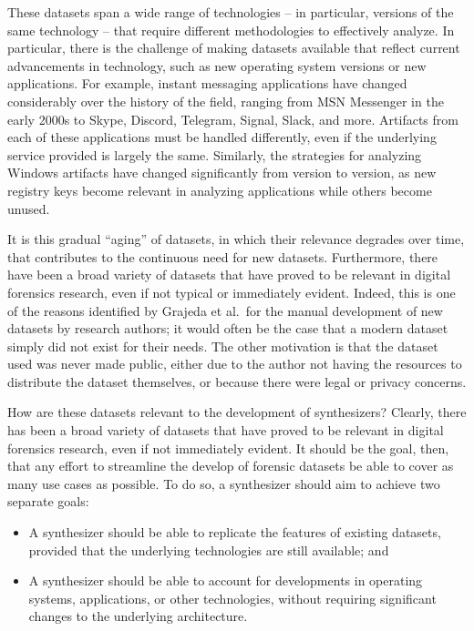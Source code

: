 \documentclass[letterpaper,12pt]{report}
\def\tightlist{}
\begin{document}
These datasets span a wide range of technologies -- in particular,
versions of the same technology -- that require different methodologies
to effectively analyze. In particular, there is the challenge of making
datasets available that reflect current advancements in technology, such
as new operating system versions or new applications. For example,
instant messaging applications have changed considerably over the
history of the field, ranging from MSN Messenger in the early 2000s to
Skype, Discord, Telegram, Signal, Slack, and more. Artifacts from each
of these applications must be handled differently, even if the
underlying service provided is largely the same. Similarly, the
strategies for analyzing Windows artifacts have changed significantly
from version to version, as new registry keys become relevant in
analyzing applications while others become unused.

It is this gradual ``aging'' of datasets, in which their relevance
degrades over time, that contributes to the continuous need for new
datasets. Furthermore, there have been a broad variety of datasets that
have proved to be relevant in digital forensics research, even if not
typical or immediately evident. Indeed, this is one of the reasons
identified by Grajeda et al.~for the manual development of new datasets
by research authors; it would often be the case that a modern dataset
simply did not exist for their needs. The other motivation is that the
dataset used was never made public, either due to the author not having
the resources to distribute the dataset themselves, or because there
were legal or privacy concerns.

How are these datasets relevant to the development of synthesizers?
Clearly, there has been a broad variety of datasets that have proved to
be relevant in digital forensics research, even if not immediately
evident. It should be the goal, then, that any effort to streamline the
develop of forensic datasets be able to cover as many use cases as
possible. To do so, a synthesizer should aim to achieve two separate
goals:

\begin{itemize}
\tightlist
\item
  A synthesizer should be able to replicate the features of existing
  datasets, provided that the underlying technologies are still
  available; and
\item
  A synthesizer should be able to account for developments in operating
  systems, applications, or other technologies, without requiring
  significant changes to the underlying architecture.
\end{itemize}
\end{document}
